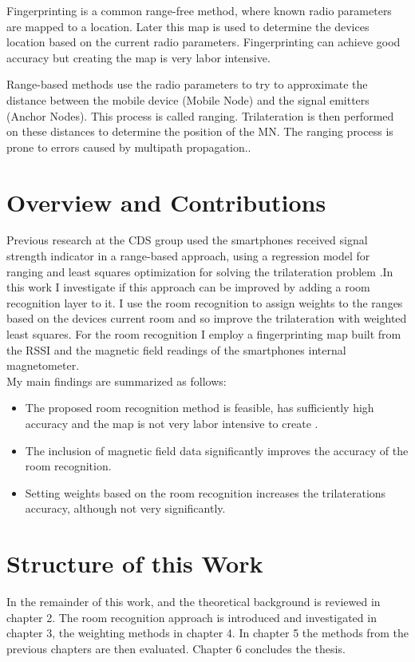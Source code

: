 Fingerprinting is a common range-free method, where known radio parameters are mapped to a location. Later this map is used to determine the devices location based on the current radio parameters. Fingerprinting can achieve good accuracy but creating the map is very labor intensive\cite{FineGrainedIndoorTracking}.

Range-based methods use the radio parameters to try to approximate the distance between the mobile device (Mobile Node) and the signal emitters (Anchor Nodes). This process is called ranging. Trilateration is then performed on these distances to determine the position of the MN. The ranging process is prone to errors caused by multipath propagation.\cite{FineGrainedIndoorTracking}.

\section{Overview and Contributions}

Previous research at the CDS group used the smartphones received signal strength indicator in a range-based approach, using a regression model for ranging and least squares optimization for solving the trilateration problem .In this work I investigate if this approach can be improved by adding a room recognition layer to it. I use the room recognition to assign weights to the ranges based on the devices current room and so improve the trilateration with weighted least squares. For the room recognition I employ a fingerprinting map built from the RSSI and the magnetic field readings of the smartphones internal magnetometer.\\

My main findings are summarized as follows:
\begin{itemize}
\item The proposed room recognition method is feasible, has sufficiently high accuracy and the map is not very labor intensive to create .
\item The inclusion of magnetic field data significantly improves the accuracy of the room recognition.
\item Setting weights based on the room recognition increases the trilaterations accuracy, although not very significantly.
\end{itemize}

\section{Structure of this Work}

\noindent In the remainder of this work,  and the theoretical background is reviewed in chapter 2. The room recognition approach is introduced and investigated in chapter 3, the weighting methods in chapter 4. In chapter 5 the methods from the previous chapters are then evaluated. Chapter 6 concludes the thesis. \\\\